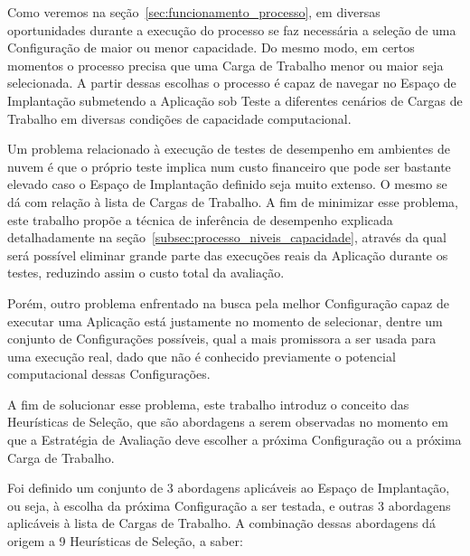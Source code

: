 Como veremos na seção~\ref{sec:funcionamento_processo}, em diversas oportunidades
durante a execução do processo se faz necessária a seleção de uma Configuração de
maior ou menor capacidade. Do mesmo modo, em certos momentos o processo precisa
que uma Carga de Trabalho menor ou maior seja selecionada. A partir dessas escolhas
o processo é capaz de navegar no Espaço de Implantação submetendo a Aplicação sob
Teste a diferentes cenários de Cargas de Trabalho em diversas condições de capacidade
computacional.

Um problema relacionado à execução de testes de desempenho em ambientes de nuvem
é que o próprio teste implica num custo financeiro que pode ser bastante elevado
caso o Espaço de Implantação definido seja muito extenso. O mesmo se dá com 
relação à lista de Cargas de Trabalho. A fim de minimizar esse problema, este
trabalho propõe a técnica de inferência de desempenho explicada
detalhadamente na seção~\ref{subsec:processo_niveis_capacidade}, através da
qual será possível eliminar grande parte das execuções reais da Aplicação
durante os testes, reduzindo assim o custo total da avaliação.

Porém, outro problema enfrentado na busca pela melhor Configuração capaz de executar 
uma Aplicação está justamente no momento de selecionar, dentre um conjunto de 
Configurações possíveis, qual a mais promissora a ser usada para uma execução real, 
dado que não é conhecido previamente o potencial computacional dessas Configurações.

A fim de solucionar esse problema, este trabalho introduz o conceito das 
Heurísticas de Seleção, que são abordagens a serem observadas no momento em que
a Estratégia de Avaliação deve escolher a próxima Configuração ou a próxima Carga 
de Trabalho. 

Foi definido um conjunto de 3 abordagens aplicáveis ao Espaço de Implantação,
ou seja, à escolha da próxima Configuração a ser testada, e outras 3 abordagens
aplicáveis à lista de Cargas de Trabalho. A combinação dessas abordagens dá origem
a 9 Heurísticas de Seleção, a saber:

